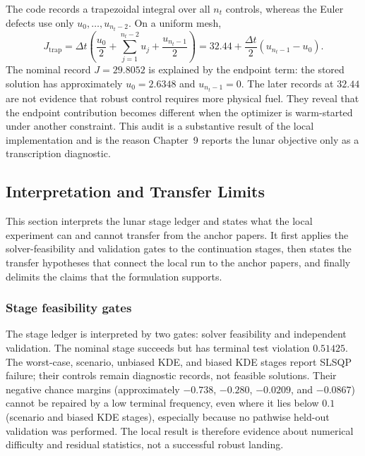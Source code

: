 The code records a trapezoidal integral over all $n_t$ controls, whereas the Euler defects use only $u_0,\ldots,u_{n_t-2}$. On a uniform mesh,
\begin{equation}
 J_{\mathrm{trap}}=\Delta t\left(\frac{u_0}{2}+\sum_{j=1}^{n_t-2}u_j+\frac{u_{n_t-1}}{2}\right)
 =32.44+\frac{\Delta t}{2}(u_{n_t-1}-u_0).
 \label{eq:quadrature-mismatch}
\end{equation}
The nominal record $J=29.8052$ is explained by the endpoint term: the stored solution has approximately $u_0=2.6348$ and $u_{n_t-1}=0$. The later records at $32.44$ are not evidence that robust control requires more physical fuel. They reveal that the endpoint contribution becomes different when the optimizer is warm-started under another constraint. This audit is a substantive result of the local implementation and is the reason Chapter~9 reports the lunar objective only as a transcription diagnostic.

\subsection{Interpretation and Transfer Limits}

This section interprets the lunar stage ledger and states what the local experiment can and cannot transfer from the anchor papers. It first applies the solver-feasibility and validation gates to the continuation stages, then states the transfer hypotheses that connect the local run to the anchor papers, and finally delimits the claims that the formulation supports.

\subsubsection{Stage feasibility gates}

The stage ledger is interpreted by two gates: solver feasibility and independent validation. The nominal stage succeeds but has terminal test violation $0.51425$. The worst-case, scenario, unbiased KDE, and biased KDE stages report SLSQP failure; their controls remain diagnostic records, not feasible solutions. Their negative chance margins (approximately $-0.738$, $-0.280$, $-0.0209$, and $-0.0867$) cannot be repaired by a low terminal frequency, even where it lies below $0.1$ (scenario and biased KDE stages), especially because no pathwise held-out validation was performed. The local result is therefore evidence about numerical difficulty and residual statistics, not a successful robust landing.

